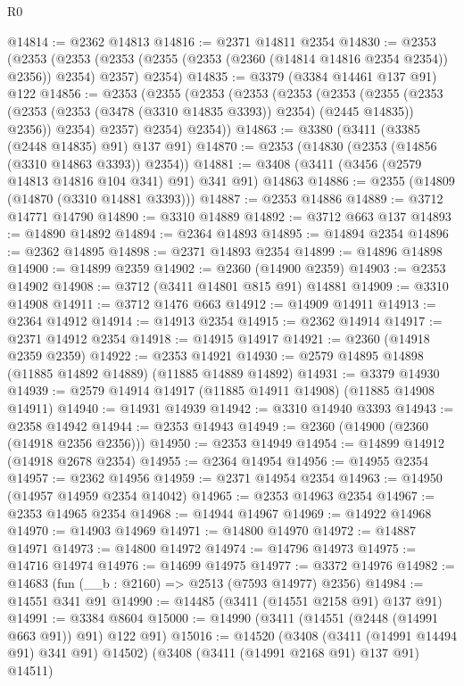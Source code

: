 \begin{lexlean}{R0}
\begin{coremodule}
@14814 := @2362 @14813
@14816 := @2371 @14811 @2354
@14830 := @2353
    (@2353
      (@2353 (@2353 (@2355 (@2353 (@2360 (@14814 @14816 @2354 @2354)) @2356)) @2354) @2357)
      @2354)
@14835 := @3379 (@3384 @14461 @137 @91) @122
@14856 := @2353
    (@2355
      (@2353
        (@2353
          (@2353
            (@2353
              (@2355
                (@2353 (@2353 (@2353 (@3478 (@3310 @14835 @3393)) @2354) (@2445 @14835)) @2356))
              @2354)
            @2357)
          @2354)
        @2354))
@14863 := @3380 (@3411 (@3385 (@2448 @14835) @91) @137 @91)
@14870 := @2353 (@14830 (@2353 (@14856 (@3310 @14863 @3393)) @2354))
@14881 := @3408 (@3411 (@3456 (@2579 @14813 @14816 @104 @341) @91) @341 @91) @14863
@14886 := @2355 (@14809 (@14870 (@3310 @14881 @3393)))
@14887 := @2353 @14886
@14889 := @3712 @14771 @14790
@14890 := @3310 @14889
@14892 := @3712 @663 @137
@14893 := @14890 @14892
@14894 := @2364 @14893
@14895 := @14894 @2354
@14896 := @2362 @14895
@14898 := @2371 @14893 @2354
@14899 := @14896 @14898
@14900 := @14899 @2359
@14902 := @2360 (@14900 @2359)
@14903 := @2353 @14902
@14908 := @3712 (@3411 @14801 @815 @91) @14881
@14909 := @3310 @14908
@14911 := @3712 @1476 @663
@14912 := @14909 @14911
@14913 := @2364 @14912
@14914 := @14913 @2354
@14915 := @2362 @14914
@14917 := @2371 @14912 @2354
@14918 := @14915 @14917
@14921 := @2360 (@14918 @2359 @2359)
@14922 := @2353 @14921
@14930 := @2579 @14895 @14898 (@11885 @14892 @14889) (@11885 @14889 @14892)
@14931 := @3379 @14930
@14939 := @2579 @14914 @14917 (@11885 @14911 @14908) (@11885 @14908 @14911)
@14940 := @14931 @14939
@14942 := @3310 @14940 @3393
@14943 := @2358 @14942
@14944 := @2353 @14943
@14949 := @2360 (@14900 (@2360 (@14918 @2356 @2356)))
@14950 := @2353 @14949
@14954 := @14899 @14912 (@14918 @2678 @2354)
@14955 := @2364 @14954
@14956 := @14955 @2354
@14957 := @2362 @14956
@14959 := @2371 @14954 @2354
@14963 := @14950 (@14957 @14959 @2354 @14042)
@14965 := @2353 @14963 @2354
@14967 := @2353 @14965 @2354
@14968 := @14944 @14967
@14969 := @14922 @14968
@14970 := @14903 @14969
@14971 := @14800 @14970
@14972 := @14887 @14971
@14973 := @14800 @14972
@14974 := @14796 @14973
@14975 := @14716 @14974
@14976 := @14699 @14975
@14977 := @3372 @14976
@14982 := @14683 (fun (__b : @2160) => @2513 (@7593 @14977) @2356)
@14984 := @14551 @341 @91
@14990 := @14485 (@3411 (@14551 @2158 @91) @137 @91)
@14991 := @3384 @8604
@15000 := @14990 (@3411 (@14551 (@2448 (@14991 @663 @91)) @91) @122 @91)
@15016 := @14520
    (@3408 (@3411 (@14991 @14494 @91) @341 @91) @14502)
    (@3408 (@3411 (@14991 @2168 @91) @137 @91) @14511)

\end{coremodule}
\end{lexlean}
